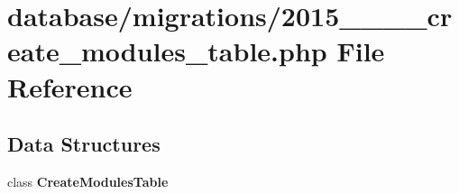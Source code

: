 \section{database/migrations/2015\+\_\+\_\+\_\+\_\+create\+\_\+modules\+\_\+table.php File Reference}
\label{2015__04__06__002555__create__modules__table_8php}
\subsection*{Data Structures}
\begin{DoxyCompactItemize}
\item 
class {\bf Create\+Modules\+Table}
\end{DoxyCompactItemize}
